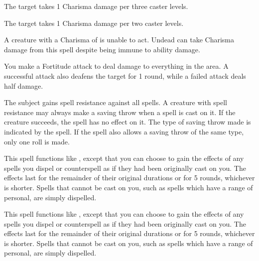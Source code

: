 \begin{spellhealthy}
    The target takes 1 Charisma damage per three caster levels.
\end{spellhealthy}
\begin{spellblood}
    The target takes 1 Charisma damage per two caster levels.
\end{spellblood}
\spellnotes A creature with a Charisma of  is unable to act. Undead can take Charisma damage from this spell despite being immune to ability damage. 

\spelleffect You make a Fortitude attack to deal damage to everything in the area. A successful attack also deafens the target for 1 round, while a failed attack deals half damage.

\spelldur{\durshort}
\spelleffect The subject gains spell resistance against all spells.
\spellnotes A creature with spell resistance may always make a saving throw when a spell is cast on it. If the creature succeeds, the spell has no effect on it. The type of saving throw made is indicated by the spell. If the spell also allows a saving throw of the same type, only one roll is made.

\spelleffect This spell functions like , except that you can choose to gain the effects of any spells you dispel or counterspell as if they had been originally cast on you. The effects last for the remainder of their original durations or for 5 rounds, whichever is shorter. Spells that cannot be cast on you, such as spells which have a range of personal, are simply dispelled.

\spelleffect This spell functions like , except that you can choose to gain the effects of any spells you dispel or counterspell as if they had been originally cast on you. The effects last for the remainder of their original durations or for 5 rounds, whichever is shorter. Spells that cannot be cast on you, such as spells which have a range of personal, are simply dispelled.

